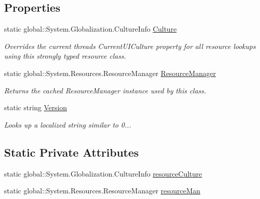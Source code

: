 \subsection*{Properties}
\begin{DoxyCompactItemize}
\item 
static global\+::\+System.\+Globalization.\+Culture\+Info \mbox{\hyperlink{class_little_weeb_library_1_1_properties_1_1_resources_a58ffc26a2061c9892ae606c75696b5ae}{Culture}}
\begin{DoxyCompactList}\small\item\em Overrides the current thread\textquotesingle{}s Current\+U\+I\+Culture property for all resource lookups using this strongly typed resource class. \end{DoxyCompactList}\item 
static global\+::\+System.\+Resources.\+Resource\+Manager \mbox{\hyperlink{class_little_weeb_library_1_1_properties_1_1_resources_a177db73ea6cb556ab6cc1b12777e1ad2}{Resource\+Manager}}
\begin{DoxyCompactList}\small\item\em Returns the cached Resource\+Manager instance used by this class. \end{DoxyCompactList}\item 
static string \mbox{\hyperlink{class_little_weeb_library_1_1_properties_1_1_resources_a8782c3cb37586a67ccab0154bd2b8d5d}{Version}}
\begin{DoxyCompactList}\small\item\em Looks up a localized string similar to 0... \end{DoxyCompactList}\end{DoxyCompactItemize}
\subsection*{Static Private Attributes}
\begin{DoxyCompactItemize}
\item 
static global\+::\+System.\+Globalization.\+Culture\+Info \mbox{\hyperlink{class_little_weeb_library_1_1_properties_1_1_resources_aeef4a113050bf5ebd1968df426863a61}{resource\+Culture}}
\item 
static global\+::\+System.\+Resources.\+Resource\+Manager \mbox{\hyperlink{class_little_weeb_library_1_1_properties_1_1_resources_a6d062a13ce609e908f117f76256a39f8}{resource\+Man}}
\end{DoxyCompactItemize}



